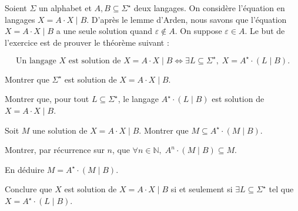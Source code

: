 
\begingroup

\begin{exercice}\label{exo:lexing/arden/challenge}

  Soient $\Sigma$ un alphabet et $A, B \subseteq \Sigma^\star$ deux langages. 
  On considère l'équation en langages $X = A\cdot X \mid B$.
  D'après le lemme d'Arden, nous savons que l'équation $X = A\cdot X\mid B$ a une seule
  solution quand $\varepsilon\notin A$.
  On suppose $\varepsilon \in A$. Le but de l'exercice est de prouver le théorème suivant :
  
  $$
  \text{Un langage }X\text{ est solution de }X = A\cdot X \mid B 
  \iff \exists L \subseteq \Sigma^\star,\; X = A^\star \cdot (L \mid B).
  $$

  \begin{questions}
  \item Montrer que $\Sigma^\star$ est solution de $X = A\cdot X \mid B$.
  \item Montrer que, pour tout $L \subseteq \Sigma^\star$, le langage $A^\star \cdot (L \mid B)$ est solution de $X = A\cdot X \mid B$.
  \item Soit $M$ une solution de $X = A\cdot X \mid B$. Montrer que $M \subseteq A^\star \cdot (M \mid B)$.
  \item Montrer, par récurrence sur $n$, que $\forall n\in\mathbb{N},\; A^n \cdot (M \mid B) \subseteq M$.
  \item En déduire $M = A^\star \cdot (M \mid B)$.
  \item Conclure que $X$ est solution de $X = A\cdot X \mid B$ si et seulement si 
    $\exists L \subseteq \Sigma^\star$ tel que $X = A^\star \cdot (L \mid B)$.
  \end{questions}

\end{exercice}

